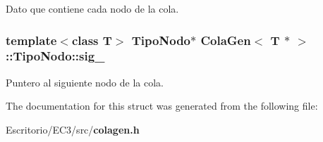 Dato que contiene cada nodo de la cola. 

\subsubsection{\setlength{\rightskip}{0pt plus 5cm}template$<$class T$>$ TipoNodo$\ast$ {\bf ColaGen}$<$ T $\ast$ $>$::TipoNodo::sig\_\-}\label{structColaGen_3_01T_01_5_01_4_1_1TipoNodo_77447d4f534ae699883fe5b5abd2d933}


Puntero al siguiente nodo de la cola. 



The documentation for this struct was generated from the following file:\begin{CompactItemize}
\item 
Escritorio/EC3/src/{\bf colagen.h}\end{CompactItemize}
